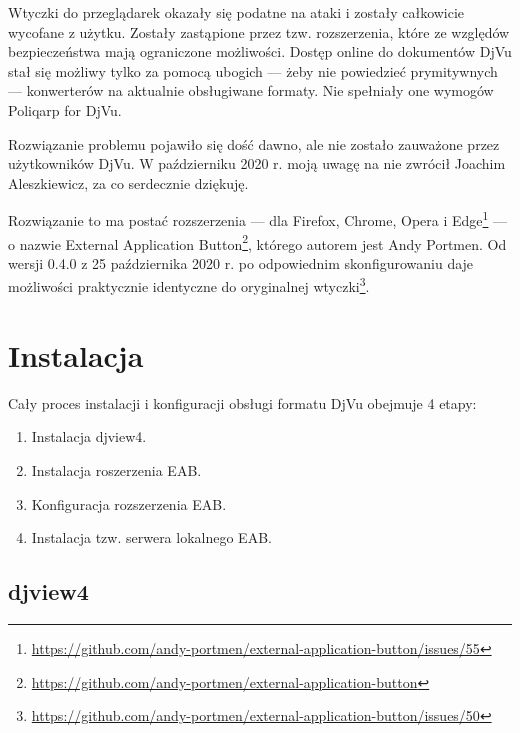 \documentclass[withmarginpar]{mwart}
\begin{document}


Wtyczki do przeglądarek okazały się podatne na ataki i zostały
całkowicie wycofane z użytku. Zostały zastąpione przez
tzw. rozszerzenia, które ze względów bezpieczeństwa mają ograniczone
możliwości. Dostęp online do dokumentów DjVu stał się możliwy tylko za
pomocą ubogich --- żeby nie powiedzieć prymitywnych --- konwerterów na
aktualnie obsługiwane formaty. Nie spełniały one wymogów
\textsf{Poliqarp for DjVu}.

Rozwiązanie problemu pojawiło się dość dawno, ale nie zostało
zauważone przez użytkowników DjVu. W październiku 2020 r. moją uwagę
na nie zwrócił Joachim Aleszkiewicz, za co serdecznie dziękuję.

Rozwiązanie to ma postać rozszerzenia --- dla Firefox, Chrome, Opera i
Edge\footnote{\url{https://github.com/andy-portmen/external-application-button/issues/55}}
--- o nazwie \textsf{External Application
  Button}\footnote{\url{https://github.com/andy-portmen/external-application-button}},
którego autorem jest Andy Portmen. Od wersji 0.4.0 z 25 października
2020 r. po odpowiednim skonfigurowaniu daje możliwości praktycznie
identyczne do oryginalnej
wtyczki\footnote{\url{https://github.com/andy-portmen/external-application-button/issues/50}}.

\section{Instalacja}
\label{sec:instalacja}


Cały proces instalacji i konfiguracji obsługi formatu DjVu obejmuje 4
etapy:

\begin{enumerate}
\item Instalacja \textsf{djview4}.
\item Instalacja roszerzenia EAB.
\item Konfiguracja rozszerzenia EAB.
\item Instalacja tzw. serwera lokalnego EAB.
\end{enumerate}


\subsection{djview4}
\label{sec:djview4}
\end{document}
